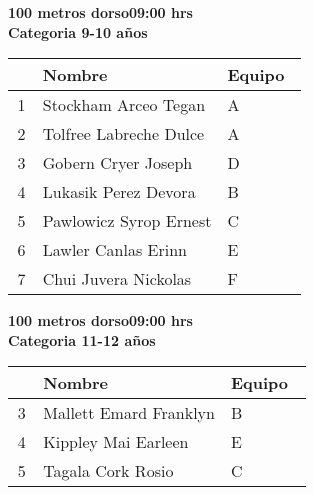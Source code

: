 \begin{minipage}{0.95\linewidth}\vspace{0.5cm} 
\begin{flushleft}
\textbf{
\hspace{-0.15cm}100 metros dorso\hspace{1.5cm}09:00 hrs \\Categoria 9-10 años}\vspace{-0.2cm} 
\end{flushleft}
\begin{tabular}{cp{0.63\linewidth}l}
\hline
& \textbf{Nombre} & \textbf{Equipo} \\ \hline
1 & Stockham Arceo Tegan & A \\ 
2 & Tolfree Labreche Dulce & A \\ 
3 & Gobern Cryer Joseph & D \\ 
4 & Lukasik Perez Devora & B \\ 
5 & Pawlowicz Syrop Ernest & C \\ 
6 & Lawler Canlas Erinn & E \\ 
7 & Chui Juvera Nickolas & F \\ 
\end{tabular}
\end{minipage}
\begin{minipage}{0.95\linewidth}\vspace{0.5cm} 
\begin{flushleft}
\textbf{
\hspace{-0.15cm}100 metros dorso\hspace{1.5cm}09:00 hrs \\Categoria 11-12 años}\vspace{-0.2cm} 
\end{flushleft}
\begin{tabular}{cp{0.63\linewidth}l}
\hline
& \textbf{Nombre} & \textbf{Equipo} \\ \hline
3 & Mallett Emard Franklyn & B \\ 
4 & Kippley Mai Earleen & E \\ 
5 & Tagala Cork Rosio & C \\ 
\end{tabular}
\end{minipage}
